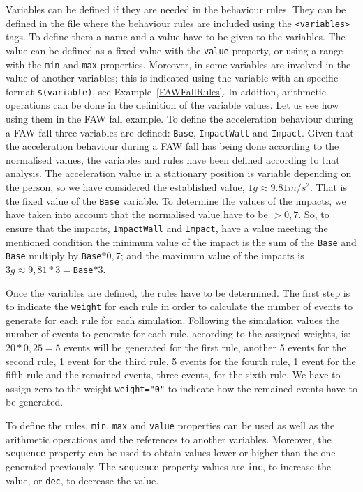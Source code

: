 \documentclass[review]{elsarticle}
\begin{document}
Variables can be defined if they are needed in the behaviour rules. They can be defined in the file where
the behaviour rules are included using the \texttt{<variables>} tags. To define them a name and a value 
have to be given to the variables. The value can be defined as a fixed value with the \texttt{value} 
property, or using a range with the \texttt{min} and \texttt{max} properties. Moreover, in some variables
are involved in the value of another variables; this is indicated using the variable with an specific 
format \texttt{\$(variable)}, see Example~\ref{FAWFallRules}. In addition, arithmetic operations can be 
done in the definition of the variable values. Let us see how using them in the FAW fall example. To 
define the acceleration behaviour during a FAW fall three variables are defined: \texttt{Base}, 
\texttt{ImpactWall} and \texttt{Impact}. Given that the acceleration behaviour during a FAW fall has
being done according to the normalised values, the variables and rules have been defined according to 
that analysis. The acceleration value in a stationary position is variable depending on the person, so 
we have considered the established value, $1g\approx9.81m/s^{2}$. That is the fixed value of the 
\texttt{Base} variable. To determine the values of the impacts, we have taken into account that the 
normalised value have to be $> 0,7$. So, to ensure that the impacts, \texttt{ImpactWall} and 
\texttt{Impact}, have a value meeting the mentioned condition the minimum value of the impact is the 
sum of the \texttt{Base} and \texttt{Base} multiply by \texttt{Base}$*0,7$; and the maximum value of the
impacts is $3g\approx9,81*3=$\texttt{Base}$*3$.

Once the variables are defined, the rules have to be determined. The first step is to indicate the 
\texttt{weight} for each rule in order to calculate the number of events to generate for each rule for 
each simulation. Following the simulation values the number of events to generate for each rule, according 
to the assigned weights, is: $20 * 0,25 = 5$ events will be generated for the first rule, another 5 events 
for the second rule, 1 event for the third rule, 5 events for the fourth rule, 1 event for the fifth
rule and the remained events, three events, for the sixth rule. We have to assign zero to the weight
\texttt{weight="0"} to indicate how the remained events have to be generated.

To define the rules, \texttt{min}, \texttt{max} and \texttt{value} properties can be used as well as the arithmetic 
operations and the references to another variables. Moreover, the \texttt{sequence} property can be used to obtain
values lower or higher than the one generated previously. The \texttt{sequence} property values are \texttt{inc}, 
to increase the value, or \texttt{dec}, to decrease the value. 
\end{document}
